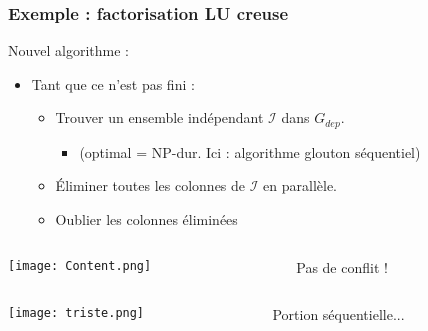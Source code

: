 \documentclass[xcolor={x11names,svgnames},x11names,svgnames]{beamer}
\begin{document}

\begin{frame}[label=sparse_lu_MIS]
  \frametitle{Exemple : factorisation LU creuse}

  \begin{block}{Nouvel algorithme :}
  \begin{itemize}
  \item Tant que ce n'est pas fini :
    \begin{itemize}
    \item Trouver un ensemble indépendant $\mathcal{I}$ dans $G_{dep}$.
      \begin{itemize}
      \item (optimal = NP-dur. Ici : algorithme glouton séquentiel)
      \end{itemize}
    \item Éliminer toutes les colonnes de $\mathcal{I}$ \alert{en parallèle}.
    \item \og Oublier\fg{} les colonnes éliminées
    \end{itemize}
  \end{itemize}
\end{block}

\bigskip

    \begin{columns}[c]
    \begin{column}{.1\textwidth}
      \texttt{[image: Content.png]}
    \end{column}
    \begin{column}[c]{.9\textwidth}

      Pas de conflit !
      
    \end{column}
  \end{columns}

  \bigskip
  
  \begin{columns}[c]
    \begin{column}{.1\textwidth}
      \texttt{[image: triste.png]}
    \end{column}
    \begin{column}[c]{.9\textwidth}

      Portion séquentielle...
      
    \end{column}
  \end{columns}
\end{frame}
\end{document}
